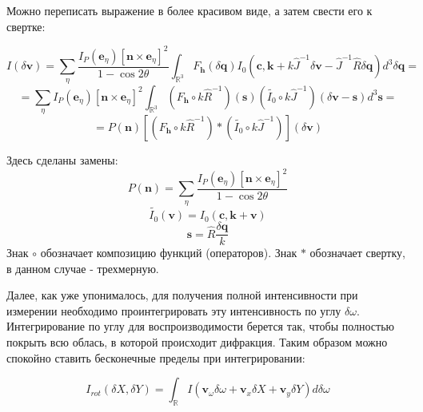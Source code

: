 \documentclass[12pt]{article}
\begin{document}
Можно переписать выражение в более красивом виде, а затем свести его к свертке:

\[ I(\delta \pmb{v}) = \sum_\eta \frac{I_P(\pmb{e}_\eta)
\left[ \pmb{n} \times \pmb{e}_\eta \right]^2}{1 - \cos{2\theta}}
\int_{\mathbb{R}^3} F_{\pmb{h}}(\delta \pmb{q}) 
I_0\left(\pmb{c}, \pmb{k} + k \hat{J}^{-1} \delta \pmb{v} -
\hat{J}^{-1} \hat{R} \delta \pmb{q}\right) d^3 \delta \pmb{q} = \]
\[ = \sum_\eta I_P(\pmb{e}_\eta)\left[ \pmb{n} \times \pmb{e}_\eta \right]^2
\int_{\mathbb{R}^3} \left(F_{\pmb{h}} \circ k \hat{R}^{-1}\right) (\pmb{s})
\left(\tilde{I_0} \circ k \hat{J}^{-1}\right) \left(\delta \pmb{v} - \pmb{s}\right) d^3 \pmb{s} =\]
\[ = P(\pmb{n}) \left[\left(F_{\pmb{h}} \circ k \hat{R}^{-1}\right) \ast
\left(\tilde{I_0} \circ k \hat{J}^{-1}\right)\right] (\delta \pmb{v})\]

Здесь сделаны замены:
\[P(\pmb{n}) = \sum_\eta
\frac{I_P(\pmb{e}_\eta)\left[ \pmb{n} \times \pmb{e}_\eta \right]^2}{1 - \cos{2\theta}}\]
\[ \tilde{I_0}(\pmb{v}) = I_0(\pmb{c}, \pmb{k} + \pmb{v}) \]
\[\pmb{s} = \hat{R} \frac{\delta \pmb{q}}{k}\]
Знак $\circ$ обозначает композицию функций (операторов).
Знак $\ast$ обозначает свертку, в данном случае - трехмерную.

Далее, как уже упонималось, для получения полной интенсивности при измерении
необходимо проинтегрировать эту интенсивность по углу $\delta \omega$. Интегрирование по
углу для воспроизводимости берется так, чтобы полностью покрыть всю облась, в которой
происходит дифракция. Таким образом можно спокойно ставить бесконечные пределы
при интегрировании:

\[ I_{rot}(\delta X, \delta Y) = \int_{\mathbb{R}} I(\pmb{v}_\omega \delta \omega +
\pmb{v}_x \delta X + \pmb{v}_y \delta Y) d \delta \omega\]
\end{document}

